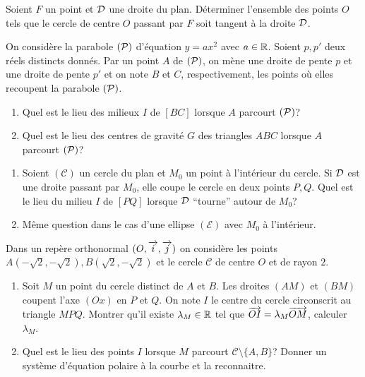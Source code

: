 \begin{exercice}
  Soient \(F\) un point et \(\Dr\) une droite du plan. Déterminer
  l'ensemble des points \(O\) tels que le cercle de centre \(O\) passant
  par \(F\) soit tangent à la droite \(\Dr\).
\end{exercice}

\begin{exercice}
  On considère la parabole \((\P)\) d'équation \(y = ax^2\) avec \(a \in
  \R\). Soient \(p, p'\) deux réels distincts donnés. Par un point \(A\)
  de \((\P)\), on mène une droite de pente \(p\) et une droite de pente
  \(p'\) et on note \(B\) et \(C\), respectivement, les points où elles
  recoupent la parabole \((\P)\).
  \begin{enumerate}
    \item Quel est le lieu des milieux \(I\) de \([BC]\) lorsque \(A\)
      parcourt \((\P)\)?
    \item Quel est le lieu des centres de gravité \(G\) des triangles
      \(ABC\) lorsque \(A\) parcourt \((\P)\)?
  \end{enumerate}
\end{exercice}

\begin{exercice}
  \begin{enumerate}
    \item Soient \((\mathcal{C})\) un cercle du plan et \(M_0\) un point
      à l'intérieur du cercle. Si \(\Dr\) est une droite passant par
      \(M_0\), elle coupe le cercle en deux points \(P, Q\). Quel est le
      lieu du milieu \(I\) de \([PQ]\) lorsque \(\Dr\) ``tourne'' autour
      de \(M_0\)?
    \item Même question dans le cas d'une ellipse \((\mathcal{E})\) avec
      \(M_0\) à l'intérieur.
  \end{enumerate}
\end{exercice}

\begin{exercice}
  Dans un repère orthonormal \((O, \vi, \vj)\) on considère les points
  \(A(-\sqrt{2}, -\sqrt{2}), B(\sqrt{2}, -\sqrt{2})\) et le cercle
  \(\mathcal{C}\) de centre \(O\) et de rayon \(2\).
  \begin{enumerate}
    \item Soit \(M\) un point du cercle distinct de \(A\) et \(B\). Les
      droites \((AM)\) et \((BM)\) coupent l'axe \((Ox)\) en \(P\) et
      \(Q\). On note \(I\) le centre du cercle circonscrit au triangle
      \(MPQ\). Montrer qu'il existe \(\lambda_M \in \R\) tel que
      \(\vect{OI} = \lambda_M \vect{OM}\), calculer \(\lambda_M\).
    \item Quel est le lieu des points \(I\) lorsque \(M\) parcourt
      \(\mathcal{C}\setminus\{A, B\}\)? Donner un système d'équation
      polaire à la courbe et la reconnaitre.
  \end{enumerate}
\end{exercice}

